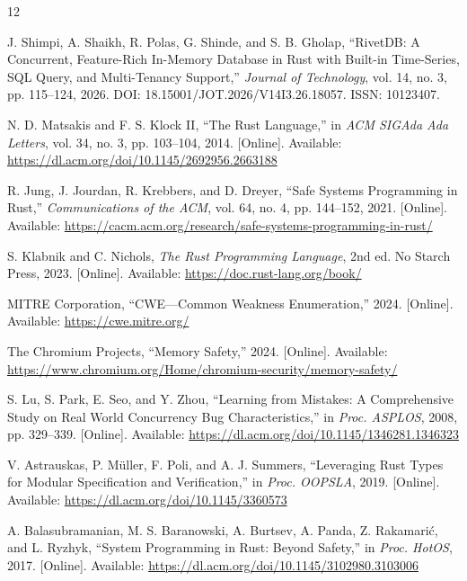 \documentclass[conference,a4paper]{IEEEtran}
\begin{document}
\begin{thebibliography}{12}

J. Shimpi, A. Shaikh, R. Polas, G. Shinde, and S. B. Gholap, ``RivetDB: A Concurrent, Feature-Rich In-Memory Database in Rust with Built-in Time-Series, SQL Query, and Multi-Tenancy Support,'' \textit{Journal of Technology}, vol. 14, no. 3, pp. 115--124, 2026. DOI: 18.15001/JOT.2026/V14I3.26.18057. ISSN: 10123407.

N. D. Matsakis and F. S. Klock II, ``The Rust Language,'' in \textit{ACM SIGAda Ada Letters}, vol. 34, no. 3, pp. 103--104, 2014. [Online]. Available: \url{https://dl.acm.org/doi/10.1145/2692956.2663188}

R. Jung, J. Jourdan, R. Krebbers, and D. Dreyer, ``Safe Systems Programming in Rust,'' \textit{Communications of the ACM}, vol. 64, no. 4, pp. 144--152, 2021. [Online]. Available: \url{https://cacm.acm.org/research/safe-systems-programming-in-rust/}

S. Klabnik and C. Nichols, \textit{The Rust Programming Language}, 2nd ed. No Starch Press, 2023. [Online]. Available: \url{https://doc.rust-lang.org/book/}

MITRE Corporation, ``CWE---Common Weakness Enumeration,'' 2024. [Online]. Available: \url{https://cwe.mitre.org/}

The Chromium Projects, ``Memory Safety,'' 2024. [Online]. Available: \url{https://www.chromium.org/Home/chromium-security/memory-safety/}

S. Lu, S. Park, E. Seo, and Y. Zhou, ``Learning from Mistakes: A Comprehensive Study on Real World Concurrency Bug Characteristics,'' in \textit{Proc. ASPLOS}, 2008, pp. 329--339. [Online]. Available: \url{https://dl.acm.org/doi/10.1145/1346281.1346323}

V. Astrauskas, P. M\"{u}ller, F. Poli, and A. J. Summers, ``Leveraging Rust Types for Modular Specification and Verification,'' in \textit{Proc. OOPSLA}, 2019. [Online]. Available: \url{https://dl.acm.org/doi/10.1145/3360573}

A. Balasubramanian, M. S. Baranowski, A. Burtsev, A. Panda, Z. Rakamari\'{c}, and L. Ryzhyk, ``System Programming in Rust: Beyond Safety,'' in \textit{Proc. HotOS}, 2017. [Online]. Available: \url{https://dl.acm.org/doi/10.1145/3102980.3103006}


\end{thebibliography}
\end{document}
